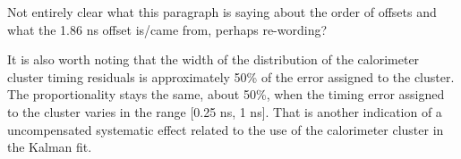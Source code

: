 {\blue Not entirely clear what this paragraph is saying about the order of offsets
and what the 1.86 ns offset is/came from, perhaps re-wording?}

It is also worth noting that the width of the distribution of the calorimeter cluster timing
residuals is
approximately 50\% of the error assigned to the cluster. The proportionality stays the same, about 50\%,  when the timing error assigned to the cluster varies in the range [0.25 ns, 1 ns].
That is another indication
of a uncompensated systematic effect related to the use of the calorimeter cluster in the Kalman fit.

\begin{figure}[h]
  \hspace{-0.8in}
\end{figure}
